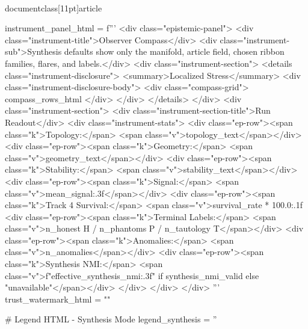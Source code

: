 \\documentclass[11pt]{article}
\begin{document}
\begin{CodeBlock}
{{{{{{    instrument_panel_html = f'''
    <div class="epistemic-panel">
        <div class="instrument-title">Observer Compass</div>
        <div class="instrument-sub">Synthesis defaults show only the manifold, article field, chosen ribbon families, flares, and labels.</div>
        <div class="instrument-section">
            <details class="instrument-disclosure">
                <summary>Localized Stress</summary>
                <div class="instrument-disclosure-body">
                    <div class="compass-grid">
                        {compass_rows_html}
                    </div>
                </div>
            </details>
        </div>
        <div class="instrument-section">
            <div class="instrument-section-title">Run Readout</div>
            <div class="instrument-stats">
                <div class="ep-row"><span class="k">Topology:</span> <span class="v">{topology_text}</span></div>
                <div class="ep-row"><span class="k">Geometry:</span> <span class="v">{geometry_text}</span></div>
                <div class="ep-row"><span class="k">Stability:</span> <span class="v">{stability_text}</span></div>
                <div class="ep-row"><span class="k">Signal:</span> <span class="v">{mean_signal:.3f}</span></div>
                <div class="ep-row"><span class="k">Track 4 Survival:</span> <span class="v">{survival_rate * 100.0:.1f}%
                <div class="ep-row"><span class="k">Terminal Labels:</span> <span class="v">{n_honest} H / {n_phantoms} P / {n_tautology} T</span></div>
                <div class="ep-row"><span class="k">Anomalies:</span> <span class="v">{n_anomalies}</span></div>
                <div class="ep-row"><span class="k">Synthesis NMI:</span> <span class="v">{f"{effective_synthesis_nmi:.3f}" if synthesis_nmi_valid else "unavailable"}</span></div>
            </div>
        </div>
    </div>
    '''
    trust_watermark_html = ""

    # Legend HTML - Synthesis Mode
    legend_synthesis = ''

}}}}}}
\end{CodeBlock}
\end{document}
